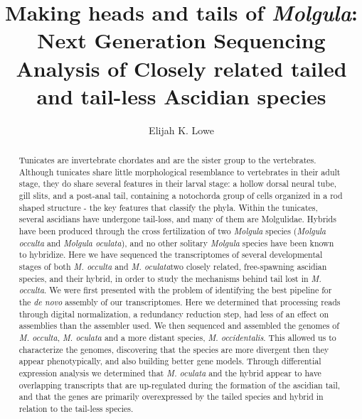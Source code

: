 \documentclass{msuphddissertation}
\author{Elijah K. Lowe} %
\title{Making heads and tails of \textit{Molgula}: Next Generation Sequencing Analysis of Closely related tailed and tail-less Ascidian species} %
\begin{document}
\maketitlepage %
\begin{abstract}
Tunicates are invertebrate chordates and are the sister group to the vertebrates. Although tunicates share little morphological resemblance to vertebrates in their adult stage, they do share several features in their larval stage: a hollow dorsal neural tube, gill slits, and a post-anal tail, containing a notochord\textemdash a group of cells organized in a rod shaped structure - the key features that classify the phyla. Within the tunicates, several ascidians have undergone tail-loss, and many of them are Molgulidae. Hybrids have been produced through the cross fertilization of two \textit{Molgula} species (\textit{Molgula occulta} and \textit{Molgula oculata}), and no other solitary \textit{Molgula} species have been known to hybridize. Here we have sequenced the transcriptomes of several developmental stages of both \textit{M. occulta} and \textit{M. oculata}\textemdash two closely related, free-spawning ascidian species, and their hybrid, in order to study the mechanisms behind tail lost in \textit{M. occulta}. We were first presented with the problem of identifying the best pipeline for the \textit{de novo} assembly of our transcriptomes. Here we determined that processing reads through digital normalization, a redundancy reduction step, had less of an effect on assemblies than the assembler used. We then sequenced and assembled the genomes of  \textit{M. occulta}, \textit{M. oculata} and a more distant species, \textit{M. occidentalis}. This allowed us to characterize the genomes, discovering that the species are more divergent then they appear phenotypically, and also building better gene models. Through differential expression analysis we determined that \textit{M. oculata} and the hybrid appear to have overlapping transcripts that are up-regulated during the formation of the ascidian tail, and that the genes are primarily overexpressed by the tailed species and hybrid in relation to the tail-less species.
\end{abstract}


\end{document}
